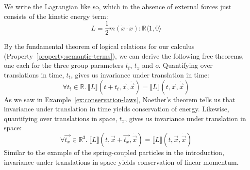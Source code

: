 \documentclass[preprint]{sigplanconf}
\theoremstyle{examplestyle}
\newcommand{\sem}[1]{\llbracket #1 \rrbracket}
\begin{document}
We write the Lagrangian like so, which in the absence of external
forces just consists of the kinetic energy term:
\begin{displaymath}
  L = \frac{1}{2}m(\dot{x} \cdot \dot{x}) : \mathbb{R}\langle 1, 0 \rangle
\end{displaymath}

By the fundamental theorem of logical relations for our calculus
(Property~\ref{property:semantic-terms}), we can derive the following
free theorems, one each for the three group parameters $t_t$, $t_x$
and $o$. Quantifying over translations in time, $t_t$, gives us
invariance under translation in time:
\begin{displaymath}
  \forall t_t \in \mathbb{R}.~\sem{L}(t + t_t, \vec{x}, \dot{\vec{x}}) = \sem{L}(t, \vec{x}, \dot{\vec{x}})
\end{displaymath}
As we saw in Example~\ref{ex:conservation-laws}, Noether's theorem
tells us that invariance under translation in time yields conservation
of energy. Likewise, quantifying over translations in space, $t_x$,
gives us invariance under translation in space:
\begin{displaymath}
  \forall \vec{t_x} \in \mathbb{R}^3.~\sem{L}(t, \vec{x} + \vec{t_x}, \dot{\vec{x}}) = \sem{L}(t, \vec{x}, \dot{\vec{x}})
\end{displaymath}
Similar to the example of the spring-coupled particles in the
introduction, invariance under translations in space yields
conservation of linear momentum.
\end{document}
